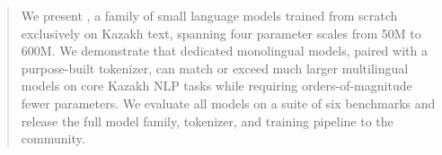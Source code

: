 \begin{abstract}
We present \sozkz{}, a family of small language models trained from scratch
exclusively on Kazakh text, spanning four parameter scales from 50M to 600M.
We demonstrate that dedicated monolingual models, paired with a
purpose-built tokenizer, can match or exceed much larger multilingual
models on core Kazakh NLP tasks while requiring orders-of-magnitude
fewer parameters.  We evaluate all models on a suite of six benchmarks
and release the full model family, tokenizer, and training pipeline
to the community.
\end{abstract}
